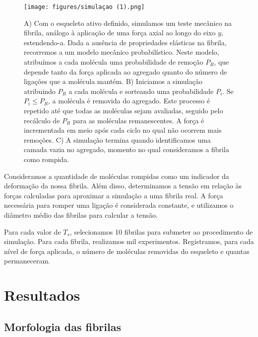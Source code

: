 \documentclass{article}
\begin{document}
        \begin{figure}[H]
            \centering
            \texttt{[image: figures/simulaçao (1).png]}
    
            \caption{A) Com o esqueleto ativo definido, simulamos um teste mecânico na fibrila, análogo à aplicação de uma força axial ao longo do eixo 
            \(y\), estendendo-a. Dada a ausência de propriedades elásticas na fibrila, recorremos a um modelo mecânico probabilístico. Neste modelo, 
            atribuímos a cada molécula uma probabilidade de remoção \(P_{R}\), que depende tanto da força aplicada ao agregado quanto do número de 
            ligações que a molécula mantém. B) Iniciamos a simulação atribuindo \(P_{R}\) a cada molécula e sorteando uma probabilidade \(P_{i}\). Se 
            \(P_{i} \leq P_{R}\), a molécula é removida do agregado. Este processo é repetido até que todas as moléculas sejam avaliadas, seguido pelo 
            recálculo de \(P_{R}\) para as moléculas remanescentes. A força é incrementada em meio após cada ciclo no qual não ocorrem mais remoções. C) 
            A simulação termina quando identificamos uma camada vazia no agregado, momento no qual consideramos a fibrila como rompida.} 
    
            \label{M4}
        \end{figure}

      
        Consideramos a quantidade de moléculas rompidas como um indicador da deformação da nossa fibrila. Além disso, determinamos a tensão em relação 
        às forças calculadas para aproximar a simulação a uma fibrila real. A força necessária para romper uma ligação é considerada constante, e 
        utilizamos o diâmetro médio das fibrilas para calcular a tensão. 

        Para cada valor de \(T_{s}\), selecionamos 10 fibrilas para submeter ao procedimento de simulação. Para cada fibrila, realizamos mil experimentos. 
        Registramos, para cada nível de força aplicada, o número de moléculas removidas do esqueleto e quantas permaneceram. 
        


\section{Resultados}
    \subsection{Morfologia das fibrilas}
\end{document}
